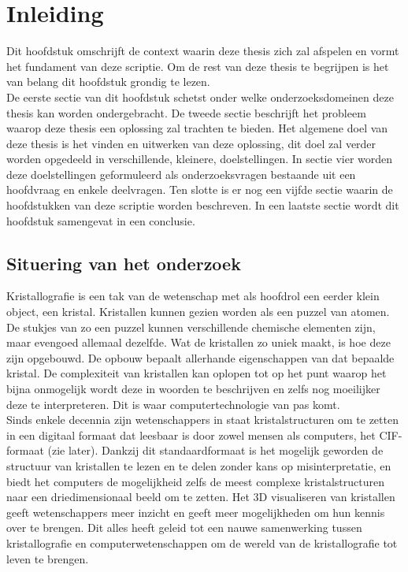 

\chapter{Inleiding}
Dit hoofdstuk omschrijft de context waarin deze thesis zich zal afspelen en vormt het fundament van deze scriptie. Om de rest van deze thesis te begrijpen is het van belang dit hoofdstuk grondig te lezen. 
\\
De eerste sectie van dit hoofdstuk schetst onder welke onderzoeksdomeinen deze thesis kan worden ondergebracht. De tweede sectie beschrijft het probleem waarop deze thesis een oplossing zal trachten te bieden. Het algemene doel van deze thesis is het vinden en uitwerken van deze oplossing, dit doel zal verder worden opgedeeld in verschillende, kleinere, doelstellingen. In sectie vier worden deze doelstellingen geformuleerd als onderzoeksvragen  bestaande uit een hoofdvraag en enkele deelvragen. Ten slotte is er nog een vijfde sectie waarin de hoofdstukken van deze scriptie worden beschreven. In een laatste sectie wordt dit hoofdstuk samengevat in een conclusie.

\section{Situering van het onderzoek}
Kristallografie is een tak van de wetenschap met als hoofdrol een eerder klein object, een kristal. Kristallen kunnen gezien worden als een puzzel van atomen. De stukjes van zo een puzzel kunnen verschillende chemische elementen zijn, maar evengoed allemaal dezelfde. Wat de kristallen zo uniek maakt, is hoe deze zijn opgebouwd. De opbouw bepaalt allerhande eigenschappen van dat bepaalde kristal. De complexiteit van kristallen kan oplopen tot op het punt waarop het bijna onmogelijk wordt deze in woorden te beschrijven en zelfs nog moeilijker deze te interpreteren. Dit is waar computertechnologie van pas komt. 
\\
Sinds enkele decennia zijn wetenschappers in staat kristalstructuren om te zetten in een digitaal formaat dat leesbaar is door zowel mensen als computers, het CIF-formaat (zie later). Dankzij dit standaardformaat is het mogelijk geworden de structuur van kristallen te lezen en te delen zonder kans op misinterpretatie, en biedt het computers de mogelijkheid zelfs de meest complexe kristalstructuren naar een driedimensionaal beeld om te zetten. Het 3D visualiseren van kristallen geeft wetenschappers meer inzicht en geeft meer mogelijkheden om hun kennis over te brengen. Dit alles heeft geleid tot een nauwe samenwerking tussen kristallografie en computerwetenschappen om de wereld van de kristallografie tot leven te brengen.


